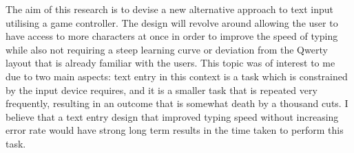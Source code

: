 \documentclass[requirements.tex]{subfiles}
\begin{document}
The aim of this research is to devise a new alternative approach to text input
utilising a game controller. The design will revolve around allowing the user
to have access to more characters at once in order to improve the speed of
typing while also not requiring a steep learning curve or deviation from the
Qwerty layout that is already familiar with the users. This topic was of
interest to me due to two main aspects: text entry in this context is a task
which is constrained by the input device requires, and it is a smaller task
that is repeated very frequently, resulting in an outcome that is somewhat death
by a thousand cuts. I believe that a text entry design that improved typing
speed without increasing error rate would have strong long term results in the
time taken to perform this task.
\end{document}
